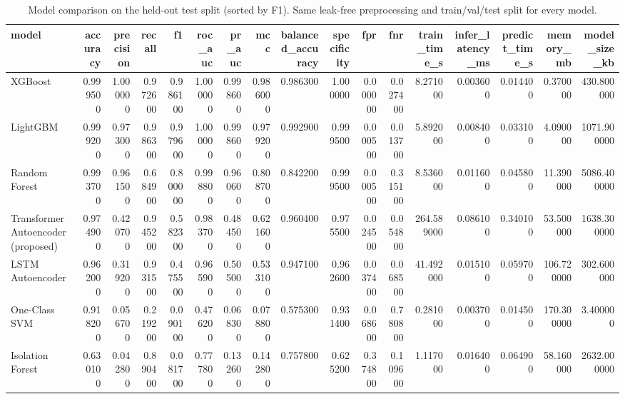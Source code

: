 \begin{table}
\caption{Model comparison on the held-out test split (sorted by F1). Same leak-free preprocessing and train/val/test split for every model.}
\label{tab:benchmark}
\begin{tabular}{lrrrrrrrrrrrrrrrr}
\toprule
model & accuracy & precision & recall & f1 & roc\_auc & pr\_auc & mcc & balanced\_accuracy & specificity & fpr & fnr & train\_time\_s & infer\_latency\_ms & predict\_time\_s & memory\_mb & model\_size\_kb \\
\midrule
XGBoost & 0.999500 & 1.000000 & 0.972600 & 0.986100 & 1.000000 & 0.998600 & 0.986000 & 0.986300 & 1.000000 & 0.000000 & 0.027400 & 8.271000 & 0.003600 & 0.014400 & 0.370000 & 430.800000 \\
LightGBM & 0.999200 & 0.973000 & 0.986300 & 0.979600 & 1.000000 & 0.998600 & 0.979200 & 0.992900 & 0.999500 & 0.000500 & 0.013700 & 5.892000 & 0.008400 & 0.033100 & 4.090000 & 1071.900000 \\
Random Forest & 0.993700 & 0.961500 & 0.684900 & 0.800000 & 0.998800 & 0.960600 & 0.808700 & 0.842200 & 0.999500 & 0.000500 & 0.315100 & 8.536000 & 0.011600 & 0.045800 & 11.390000 & 5086.400000 \\
Transformer Autoencoder (proposed) & 0.974900 & 0.420700 & 0.945200 & 0.582300 & 0.983700 & 0.484500 & 0.621600 & 0.960400 & 0.975500 & 0.024500 & 0.054800 & 264.589000 & 0.086100 & 0.340100 & 53.500000 & 1638.300000 \\
LSTM Autoencoder & 0.962000 & 0.319200 & 0.931500 & 0.475500 & 0.965900 & 0.505000 & 0.533100 & 0.947100 & 0.962600 & 0.037400 & 0.068500 & 41.492000 & 0.015100 & 0.059700 & 106.720000 & 302.600000 \\
One-Class SVM & 0.918200 & 0.056700 & 0.219200 & 0.090100 & 0.476200 & 0.068300 & 0.078800 & 0.575300 & 0.931400 & 0.068600 & 0.780800 & 0.281000 & 0.003700 & 0.014500 & 170.300000 & 3.400000 \\
Isolation Forest & 0.630100 & 0.042800 & 0.890400 & 0.081700 & 0.777800 & 0.132600 & 0.142800 & 0.757800 & 0.625200 & 0.374800 & 0.109600 & 1.117000 & 0.016400 & 0.064900 & 58.160000 & 2632.000000 \\
\bottomrule
\end{tabular}
\end{table}
